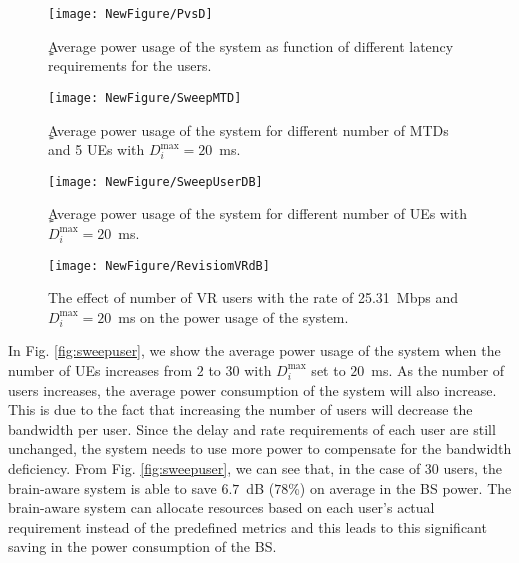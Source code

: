 \documentclass[journal,draftclsnofoot,onecolumn,12pt]{IEEEtran}%
\begin{document}
	\begin{figure}[!t]
    \begin{minipage}{0.5\textwidth}
		\centering
		\texttt{[image: NewFigure/PvsD]}
		\caption{ٍAverage power usage of the system as function of different latency requirements for the users. }
		\label{fig:power versus delay}
	\end{minipage}
    	\begin{minipage}{0.5\textwidth}
		\centering
		\texttt{[image: NewFigure/SweepMTD]}
		\caption{ٍ{Average power usage of the system for different number of MTDs and 5 UEs with  $D_i^{\max}=20$~ms.}}
		\label{fig:sweepMTD}
        \end{minipage}
	\end{figure}  
		\begin{figure}[!t]
    \begin{minipage}{0.5\textwidth}
    	\centering
		\texttt{[image: NewFigure/SweepUserDB]}
		\caption{ٍ{Average power usage of the system for different number of UEs with  $D_i^{\max}=20$~ms.}}
		\label{fig:sweepuser}
   \end{minipage}
    	\begin{minipage}{0.5\textwidth}
	\centering
	\texttt{[image: NewFigure/RevisiomVRdB]}
	\caption{{The effect of number of VR users with the rate of 25.31~Mbps and $D_i^{\max}=20$~ms on the power usage of the system.}}
	\label{fig:VR}
        \end{minipage}

	\end{figure}  



In Fig. \ref{fig:sweepuser}, we show the average power usage of the system when the number of UEs increases from $2$ to $30$ with $D_i^{\max}$ set to $20$~ms. As the number of users increases, the average power consumption of the system will also increase. This is due to the fact that increasing the number of users will decrease the bandwidth per user. Since the delay and rate requirements of each user are still unchanged, the system needs to use more power to compensate for the bandwidth deficiency. From Fig. \ref{fig:sweepuser}, we can see that, in the case of $30$ users, the brain-aware system is able to save  $6.7$~dB ($78$\%) on average in the BS power. The brain-aware system can allocate resources based on each user's actual requirement  instead of the predefined metrics and this leads to this significant saving in the power consumption of the BS. 
\end{document}
